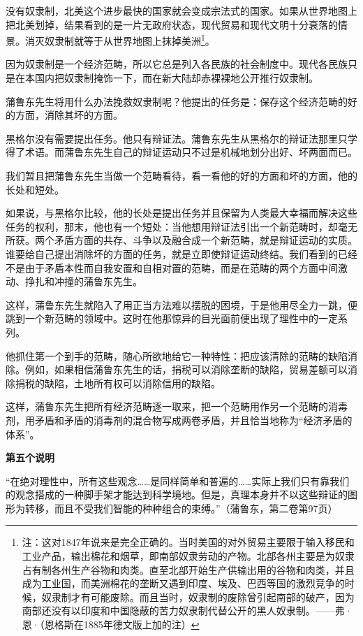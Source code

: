 \documentclass[a4paper,twoside,12pt,AutoFakeBold]{ctexart}
\begin{document}
没有奴隶制，北美这个进步最快的国家就会变成宗法式的国家。如果从世界地图上把北美划掉，结果看到的是一片无政府状态，现代贸易和现代文明十分衰落的情景。消灭奴隶制就等于从世界地图上抹掉美洲\footnote{注：这对1847年说来是完全正确的。当时美国的对外贸易主要限于输入移民和工业产品，输出棉花和烟草，即南部奴隶劳动的产物。北部各州主要是为奴隶占有制各州生产谷物和肉类。直至北部开始生产供输出用的谷物和肉类，并且成为工业国，而美洲棉花的垄断又遇到印度、埃及、巴西等国的激烈竞争的时候，奴隶制才有可能废除。而且当时，奴隶制的废除曾引起南部的破产，因为南部还没有以印度和中国隐蔽的苦力奴隶制代替公开的黑人奴隶制。——弗·恩·（恩格斯在1885年德文版上加的注）}。

因为奴隶制是一个经济范畴，所以它总是列入各民族的社会制度中。现代各民族只是在本国内把奴隶制掩饰一下，而在新大陆却赤裸裸地公开推行奴隶制。

蒲鲁东先生将用什么办法挽救奴隶制呢？他提出的任务是：保存这个经济范畴的好的方面，消除其坏的方面。

黑格尔没有需要提出任务。他只有辩证法。蒲鲁东先生从黑格尔的辩证法那里只学得了术语。而蒲鲁东先生自己的辩证运动只不过是机械地划分出好、坏两面而已。

我们暂且把蒲鲁东先生当做一个范畴看待，看一看他的好的方面和坏的方面，他的长处和短处。

如果说，与黑格尔比较，他的长处是提出任务并且保留为人类最大幸福而解决这些任务的权利，那末，他也有一个短处：当他想用辩证法引出一个新范畴时，却毫无所获。两个矛盾方面的共存、斗争以及融合成一个新范畴，就是辩证运动的实质。谁要给自己提出消除坏的方面的任务，就是立即使辩证运动终结。我们看到的已经不是由于矛盾本性而自我安置和自相对置的范畴，而是在范畴的两个方面中间激动、挣扎和冲撞的蒲鲁东先生。

这样，蒲鲁东先生就陷入了用正当方法难以摆脱的困境，于是他用尽全力一跳，便跳到一个新范畴的领域中。这时在他那惊异的目光面前便出现了理性中的一定系列。

他抓住第一个到手的范畴，随心所欲地给它一种特性：把应该清除的范畴的缺陷消除。例如，如果相信蒲鲁东先生的话，捐税可以消除垄断的缺陷，贸易差额可以消除捐税的缺陷，土地所有权可以消除信用的缺陷。

这样，蒲鲁东先生把所有经济范畴逐一取来，把一个范畴用作另一个范畴的消毒剂，用矛盾和矛盾的消毒剂的混合物写成两卷矛盾，并且恰当地称为“经济矛盾的体系”。

\begin{center}
    \textbf{第五个说明}
\end{center}

\begin{fangsong}
    “在绝对理性中，所有这些观念……是同样简单和普遍的……实际上我们只有靠我们的观念搭成的一种脚手架才能达到科学境地。但是，真理本身并不以这些辩证的图形为转移，而且不受我们智能的种种组合的束缚。”（蒲鲁东，第二卷第97页）
\end{fangsong}
\end{document}
